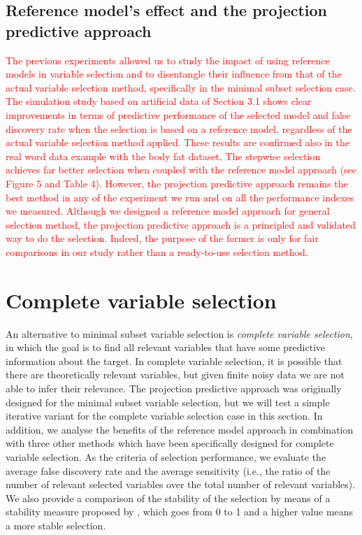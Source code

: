 \documentclass[a4]{article}
\let\rmarkdownfootnote\footnote%
\def\footnote{\protect\rmarkdownfootnote}
\theoremstyle{definition}
\newcommand{\fede}[1]{\textcolor{red}{#1}}
\begin{document}
\subsection{Reference model's effect and the projection predictive approach}
\fede{The previous experiments allowed us to study the impact of using reference models in variable selection and to disentangle their influence from that of the actual variable selection method, specifically in the minimal subset selection case.
The simulation study based on artificial data of Section 3.1 shows clear improvements in terms of predictive performance of the selected model and false discovery rate when the selection is based on a reference model, regardless of the actual variable selection method applied. These results are confirmed also in the real word data example with the body fat dataset. The stepwise selection achieves far better selection when coupled with the reference model approach (see Figure 5 and Table 4). However, the projection predictive approach remains the best method in any of the experiment we run and on all the performance indexes we measured. Although we designed a reference model approach for general selection method, the projection predictive approach is a principled and validated way to do the selection. Indeed, the purpose of the former is only for fair comparisons in our study rather than a ready-to-use selection method.}

\section{Complete variable selection}\label{comparison-complete-subset}
\label{complete-selection}

An alternative to minimal subset variable selection is \emph{complete
  variable selection}, in which the goal is to find all relevant
variables that have some predictive information about the target. In
complete variable selection, it is possible that there are theoretically
relevant variables, but given finite noisy data we are not able to infer their relevance.
The projection predictive approach was originally designed for the minimal subset
variable selection, but we will test a simple iterative variant for the complete
variable selection case in this section.
 In addition, we analyse the benefits of the reference
model approach in combination with three other
methods which have been specifically designed for complete variable selection. 
As the criteria of selection performance, we evaluate the average false
discovery rate and the average
sensitivity (i.e., the ratio of the number of relevant selected
variables over the total number of relevant variables). We also provide
a comparison of the stability of the selection by means of a stability
measure proposed by \citet{paper:stability}, which goes from 0 to 1 and a higher value 
means a more stable selection. 
%
\end{document}

